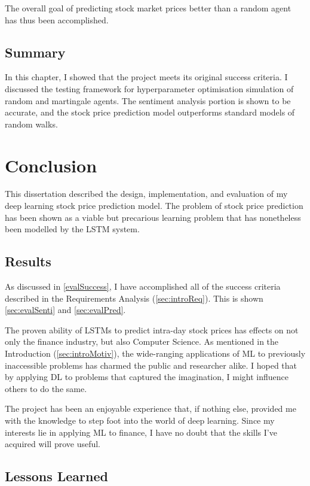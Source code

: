 \documentclass[12pt,a4paper,twoside,openright]{report}
\begin{document}
The overall goal of predicting stock market prices better than a random agent has thus been accomplished. 

\section{Summary}

In this chapter, I showed that the project meets its original success criteria. I discussed
the testing framework for hyperparameter optimisation simulation of random and martingale agents.
The sentiment analysis portion is shown to be accurate, and the stock price prediction model outperforms standard
models of random walks.

\chapter{Conclusion}
This dissertation described the design, implementation, and evaluation of my deep learning
stock price prediction model. The problem of stock price prediction has been shown as a
viable but precarious learning problem that has nonetheless been modelled by the LSTM
system.

\section{Results}

As discussed in \cref{evalSuccess}, I have accomplished all of the success criteria
described in the Requirements Analysis (\cref{sec:introReq}). This is shown \cref{sec:evalSenti}
and \cref{sec:evalPred}.

The proven ability of LSTMs to predict intra-day stock prices has effects on
not only the finance industry, but also Computer Science. As mentioned in the Introduction (\cref{sec:introMotiv}),
the wide-ranging applications of ML to previously inaccessible problems has
charmed the public and researcher alike. I hoped that by applying DL to
problems that captured the imagination, I might influence others to
do the same. 

The project has been an enjoyable experience that, if nothing else, provided me with
the knowledge to step foot into the world of deep learning. Since my interests
lie in applying ML to finance, I have no doubt that the skills I've acquired will prove
useful.

\section{Lessons Learned}
\end{document}
